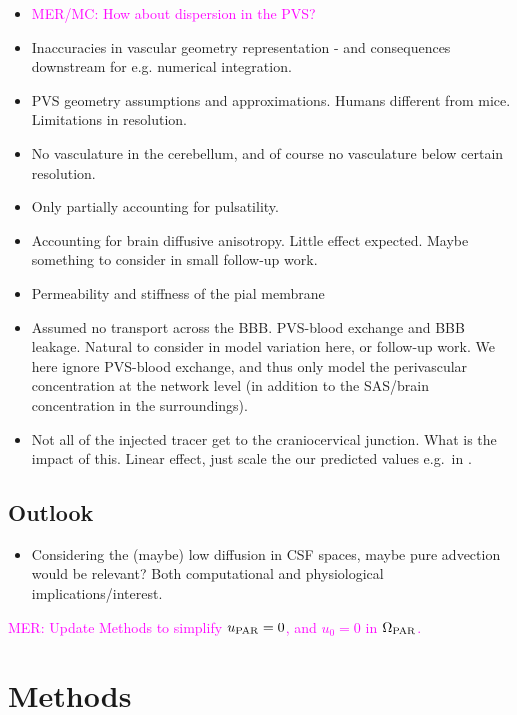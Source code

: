 \documentclass[fleqn,10pt]{wlscirep}
\newcommand{\mer}[1]{\textcolor{magenta}{#1}}
\begin{document}
\begin{itemize}
\item
  \mer{MER/MC: How about dispersion in the PVS?}
\item 
  Inaccuracies in vascular geometry representation - and consequences downstream for e.g. numerical integration.
\item
  PVS geometry assumptions and approximations. Humans different from mice. Limitations in resolution.
\item
  No vasculature in the cerebellum, and of course no vasculature below certain resolution.
\item
  Only partially accounting for pulsatility. 
\item
  Accounting for brain diffusive anisotropy. Little effect expected. Maybe something to consider in small follow-up work.
\item
  Permeability and stiffness of the pial membrane
\item
  Assumed no transport across the BBB. PVS-blood exchange and BBB
  leakage. Natural to consider in model variation here, or follow-up
  work. We here ignore PVS-blood exchange, and thus only model the
  perivascular concentration at the network level (in addition to the
  SAS/brain concentration in the surroundings).
\item
  Not all of the injected tracer get to the craniocervical
  junction. What is the impact of this. Linear effect, just scale the
  our predicted values e.g.~in .
\end{itemize}

\subsection*{Outlook}

\begin{itemize}
\item
  Considering the (maybe) low diffusion in CSF spaces, maybe pure
  advection would be relevant? Both computational and physiological
  implications/interest.
\end{itemize}

\newpage

\mer{MER: Update Methods to simplify $u_{\rm PAR} = 0$, and $u_0 = 0$ in $\Omega_{\rm PAR}$.}

\section*{Methods}
\end{document}
